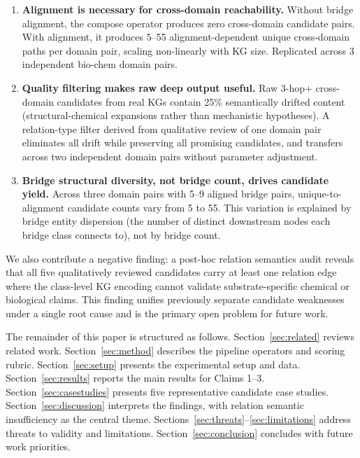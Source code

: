 \begin{enumerate}[leftmargin=*, label=\textbf{\arabic*.}]

\item \textbf{Alignment is necessary for cross-domain reachability.}
Without bridge alignment, the compose operator produces zero cross-domain
candidate pairs.
With alignment, it produces 5--55 alignment-dependent unique cross-domain paths
per domain pair, scaling non-linearly with KG size.
Replicated across 3 independent bio-chem domain pairs.

\item \textbf{Quality filtering makes raw deep output useful.}
Raw 3-hop+ cross-domain candidates from real KGs contain
25\% semantically drifted content (structural-chemical expansions
rather than mechanistic hypotheses).
A relation-type filter derived from qualitative review of one domain pair
eliminates all drift while preserving all promising candidates, and
transfers across two independent domain pairs without parameter adjustment.

\item \textbf{Bridge structural diversity, not bridge count, drives candidate yield.}
Across three domain pairs with 5--9 aligned bridge pairs,
unique-to-alignment candidate counts vary from 5 to 55.
This variation is explained by bridge entity dispersion (the number of
distinct downstream nodes each bridge class connects to), not by bridge count.

\end{enumerate}

We also contribute a negative finding: a post-hoc relation semantics audit
reveals that all five qualitatively reviewed candidates carry at least one
relation edge where the class-level KG encoding cannot validate
substrate-specific chemical or biological claims.
This finding unifies previously separate candidate weaknesses under a single
root cause and is the primary open problem for future work.

The remainder of this paper is structured as follows.
Section~\ref{sec:related} reviews related work.
Section~\ref{sec:method} describes the pipeline operators and scoring rubric.
Section~\ref{sec:setup} presents the experimental setup and data.
Section~\ref{sec:results} reports the main results for Claims 1--3.
Section~\ref{sec:casestudies} presents five representative candidate case studies.
Section~\ref{sec:discussion} interprets the findings, with relation semantic
insufficiency as the central theme.
Sections~\ref{sec:threats}--\ref{sec:limitations} address threats to validity
and limitations.
Section~\ref{sec:conclusion} concludes with future work priorities.
